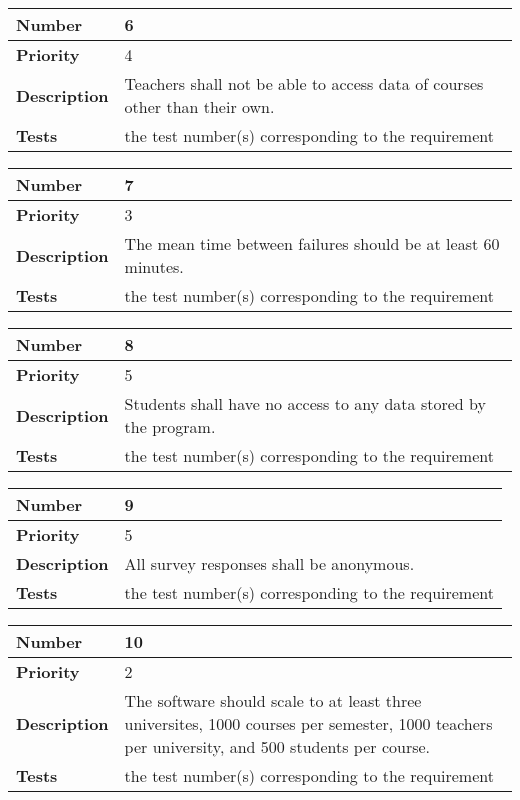 \documentclass{article}
\begin{document}
\begin{center}
\bigskip
{}
\begin{tabular}{|p{3.5cm}|p{7.5cm}|} 
\hline
\textbf{Number} & 6  \\
\hline
\textbf{Priority} & 4\\ 
\hline
\textbf{Description} & Teachers shall not be able to access data of courses other than their own. \\ 
\hline
\textbf{Tests }& the test number(s) corresponding to the requirement \\ 
\hline
\end{tabular}


\bigskip
{}
\begin{tabular}{|p{3.5cm}|p{7.5cm}|} 
\hline
\textbf{Number} & 7  \\
\hline
\textbf{Priority} & 3\\ 
\hline
\textbf{Description} & The mean time between failures should be at least 60 minutes. \\ 
\hline
\textbf{Tests }& the test number(s) corresponding to the requirement \\ 
\hline
\end{tabular}


\bigskip
{}
\begin{tabular}{|p{3.5cm}|p{7.5cm}|} 
\hline
\textbf{Number} & 8  \\
\hline
\textbf{Priority} & 5\\ 
\hline
\textbf{Description} & Students shall have no access to any data stored by the program. \\ 
\hline
\textbf{Tests }& the test number(s) corresponding to the requirement \\ 
\hline
\end{tabular}


\bigskip
{}
\begin{tabular}{|p{3.5cm}|p{7.5cm}|} 
\hline
\textbf{Number} & 9  \\
\hline
\textbf{Priority} & 5 \\ 
\hline
\textbf{Description} & All survey responses shall be anonymous. \\ 
\hline
\textbf{Tests }& the test number(s) corresponding to the requirement \\ 
\hline
\end{tabular}


\bigskip
{}
\begin{tabular}{|p{3.5cm}|p{7.5cm}|} 
\hline
\textbf{Number} & 10  \\
\hline
\textbf{Priority} & 2\\ 
\hline
\textbf{Description} & The software should scale to at least three universites, 1000 courses per semester, 1000 teachers per university, and 500 students per course. \\ 
\hline
\textbf{Tests }& the test number(s) corresponding to the requirement \\ 
\hline
\end{tabular}



\end{center}
\end{document}
